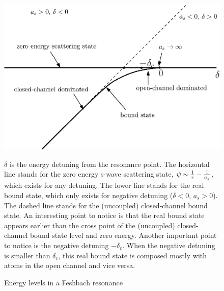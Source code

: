 \documentclass[reprint,pra]{revtex4-1}
\begin{document}


\begin{figure}[htbp]
\begin{center}
\includegraphics[width=0.8\columnwidth]{levels}
\caption{Energy levels in a Feshbach resonance\label{fig:intro:levels}} 
\parbox{0.9\columnwidth}{\raggedright \small $\delta$ is the energy detuning from the resonance point.  The horizontal line stands for the zero energy s-wave scattering state, $\psi\sim\frac{1}{r}-\frac{1}{a_s}$, which exists for any detuning.  The lower line stands for the real bound state, which only exists for negative detuning ($\delta<0$, $a_s>0$). The dashed line stands for the (uncoupled) closed-channel bound state.  An interesting point to notice is that the real bound state appears earlier than the cross point of the (uncoupled) closed-channel bound state level and zero energy. Another important point to notice is the negative detuning $-\delta_c$.  When the negative detuning is smaller than $\delta_c$, this real bound state is composed mostly with atoms in the open channel and vice versa.  %
}

\end{center}
\end{figure}
\end{document}
